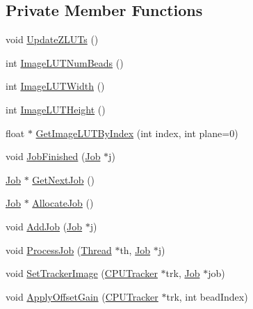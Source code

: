 \subsection*{Private Member Functions}
\begin{DoxyCompactItemize}
\item 
void \hyperlink{class_queued_c_p_u_tracker_ab140a55e7bb53cb4c5ad75e686d11621}{Update\+Z\+L\+U\+Ts} ()
\item 
int \hyperlink{class_queued_c_p_u_tracker_abc03e0debdfed1f1dcf17b2fe548ed55}{Image\+L\+U\+T\+Num\+Beads} ()
\item 
int \hyperlink{class_queued_c_p_u_tracker_a7c66d7294271781f726fc37a8778ac38}{Image\+L\+U\+T\+Width} ()
\item 
int \hyperlink{class_queued_c_p_u_tracker_a2cbe22c62e73f8c14bfe8fedf679a747}{Image\+L\+U\+T\+Height} ()
\item 
float $\ast$ \hyperlink{class_queued_c_p_u_tracker_a93bcd0a51e3ad99eea9c1a2c89aad5ca}{Get\+Image\+L\+U\+T\+By\+Index} (int index, int plane=0)
\item 
void \hyperlink{class_queued_c_p_u_tracker_a2ac0a94b7cef62813fe1698ebc3b6a3d}{Job\+Finished} (\hyperlink{struct_queued_c_p_u_tracker_1_1_job}{Job} $\ast$j)
\item 
\hyperlink{struct_queued_c_p_u_tracker_1_1_job}{Job} $\ast$ \hyperlink{class_queued_c_p_u_tracker_a2839a72ef9815ce32465a47ca8bfd01b}{Get\+Next\+Job} ()
\item 
\hyperlink{struct_queued_c_p_u_tracker_1_1_job}{Job} $\ast$ \hyperlink{class_queued_c_p_u_tracker_a5791133fa3b770a231d91b91d27bfed7}{Allocate\+Job} ()
\item 
void \hyperlink{class_queued_c_p_u_tracker_aa71806abbaa3a586aa0be750af7514bf}{Add\+Job} (\hyperlink{struct_queued_c_p_u_tracker_1_1_job}{Job} $\ast$j)
\item 
void \hyperlink{class_queued_c_p_u_tracker_a3c827ffb590b8e80b7e5a585f432ace9}{Process\+Job} (\hyperlink{struct_queued_c_p_u_tracker_1_1_thread}{Thread} $\ast$th, \hyperlink{struct_queued_c_p_u_tracker_1_1_job}{Job} $\ast$j)
\item 
void \hyperlink{class_queued_c_p_u_tracker_a7817003628ae040aaed49716d6ad7d6c}{Set\+Tracker\+Image} (\hyperlink{class_c_p_u_tracker}{C\+P\+U\+Tracker} $\ast$trk, \hyperlink{struct_queued_c_p_u_tracker_1_1_job}{Job} $\ast$job)
\item 
void \hyperlink{class_queued_c_p_u_tracker_af20f1af3e29c62b0e16f3803b9c9ad43}{Apply\+Offset\+Gain} (\hyperlink{class_c_p_u_tracker}{C\+P\+U\+Tracker} $\ast$trk, int bead\+Index)
\end{DoxyCompactItemize}
